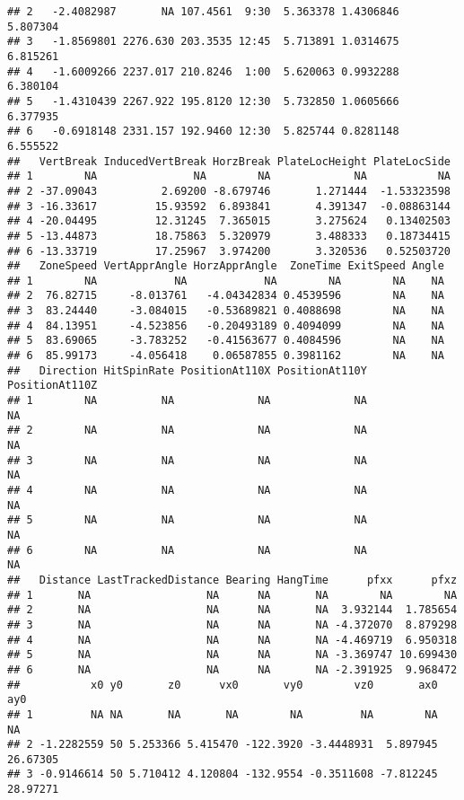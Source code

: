 \documentclass[]{article}
\begin{document}
\begin{verbatim}
## 2   -2.4082987       NA 107.4561  9:30  5.363378 1.4306846  5.807304
## 3   -1.8569801 2276.630 203.3535 12:45  5.713891 1.0314675  6.815261
## 4   -1.6009266 2237.017 210.8246  1:00  5.620063 0.9932288  6.380104
## 5   -1.4310439 2267.922 195.8120 12:30  5.732850 1.0605666  6.377935
## 6   -0.6918148 2331.157 192.9460 12:30  5.825744 0.8281148  6.555522
##   VertBreak InducedVertBreak HorzBreak PlateLocHeight PlateLocSide
## 1        NA               NA        NA             NA           NA
## 2 -37.09043          2.69200 -8.679746       1.271444  -1.53323598
## 3 -16.33617         15.93592  6.893841       4.391347  -0.08863144
## 4 -20.04495         12.31245  7.365015       3.275624   0.13402503
## 5 -13.44873         18.75863  5.320979       3.488333   0.18734415
## 6 -13.33719         17.25967  3.974200       3.320536   0.52503720
##   ZoneSpeed VertApprAngle HorzApprAngle  ZoneTime ExitSpeed Angle
## 1        NA            NA            NA        NA        NA    NA
## 2  76.82715     -8.013761   -4.04342834 0.4539596        NA    NA
## 3  83.24440     -3.084015   -0.53689821 0.4088698        NA    NA
## 4  84.13951     -4.523856   -0.20493189 0.4094099        NA    NA
## 5  83.69065     -3.783252   -0.41563677 0.4084596        NA    NA
## 6  85.99173     -4.056418    0.06587855 0.3981162        NA    NA
##   Direction HitSpinRate PositionAt110X PositionAt110Y PositionAt110Z
## 1        NA          NA             NA             NA             NA
## 2        NA          NA             NA             NA             NA
## 3        NA          NA             NA             NA             NA
## 4        NA          NA             NA             NA             NA
## 5        NA          NA             NA             NA             NA
## 6        NA          NA             NA             NA             NA
##   Distance LastTrackedDistance Bearing HangTime      pfxx      pfxz
## 1       NA                  NA      NA       NA        NA        NA
## 2       NA                  NA      NA       NA  3.932144  1.785654
## 3       NA                  NA      NA       NA -4.372070  8.879298
## 4       NA                  NA      NA       NA -4.469719  6.950318
## 5       NA                  NA      NA       NA -3.369747 10.699430
## 6       NA                  NA      NA       NA -2.391925  9.968472
##           x0 y0       z0      vx0       vy0        vz0       ax0      ay0
## 1         NA NA       NA       NA        NA         NA        NA       NA
## 2 -1.2282559 50 5.253366 5.415470 -122.3920 -3.4448931  5.897945 26.67305
## 3 -0.9146614 50 5.710412 4.120804 -132.9554 -0.3511608 -7.812245 28.97271

\end{verbatim}
\end{document}
